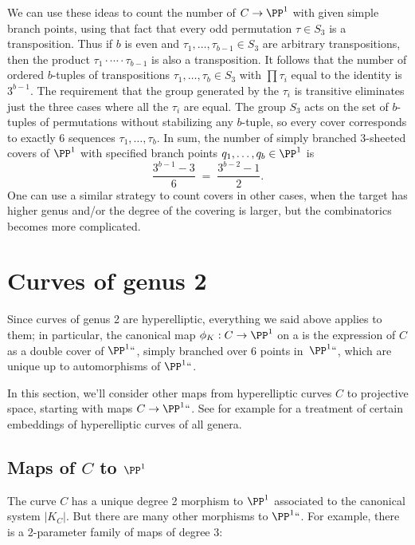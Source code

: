 \begin{example}
We can use these ideas to count the number of
%
$C \to \PP^1$ with given simple branch points, using that fact that every
odd permutation $\tau \in S_3$ is a transposition. Thus if $b$ is even
and  $\tau_1,\dots,\tau_{b-1} \in S_3$ are arbitrary transpositions,
then the product
$\tau_1\cdot \cdots\cdot \tau_{b-1}$ is also a
 transposition. It follows that the number of ordered $b$-tuples of
 transpositions $\tau_1,\dots,\tau_{b} \in S_3$ with $\prod \tau_i$
 equal to the identity is $3^{b-1}$. The requirement that the group
 generated by the $\tau_i$ is transitive eliminates just the three
 cases where all the $\tau_i$ are equal. The group $S_3$ acts on the
 set of $b$-tuples of permutations without stabilizing any $b$-tuple,
 so every cover corresponds to exactly 6 sequences
  $\tau_1,\dots,\tau_b$. In sum, the number of simply branched
  3-sheeted covers of $\PP^1$ with specified branch points
  $q_1,\dots,q_b \in \PP^1$ is
$$
\frac{3^{b-1} - 3}{6} \; = \; \frac{3^{b-2} - 1}{2}.
$$
One can use a similar strategy to count covers in other cases, when the
target has higher genus and/or the degree of the covering is larger,
but the combinatorics becomes more complicated.
\end{example}

\section{Curves of genus 2}
\label{genus 2 section}

Since  curves of genus 2 are hyperelliptic, everything we said above
applies to them; in particular, the canonical map $\phi_K : C \to \PP^1$
on a
%
 is the expression of $C$ as a double cover of
$\PP^1` `$, simply branched over 6 points in~$\PP^1` `$, which are unique up
to automorphisms of $\PP^1` `$.

In this section, we'll consider other maps from hyperelliptic curves $C$
to projective space, starting with maps $C \to \PP^1` `$.
See for example \cite{transcanonical} for a treatment of certain
embeddings of hyperelliptic curves of all genera.

\subsection*{Maps of $C$ to $\PP^1$}

The curve $C$ has a unique degree 2 morphism to $\PP^1$  associated
to the canonical system $|K_C|$. But there are many other morphisms to
$\PP^1` `$. For example, there is a 2-parameter
family of maps of degree 3:

